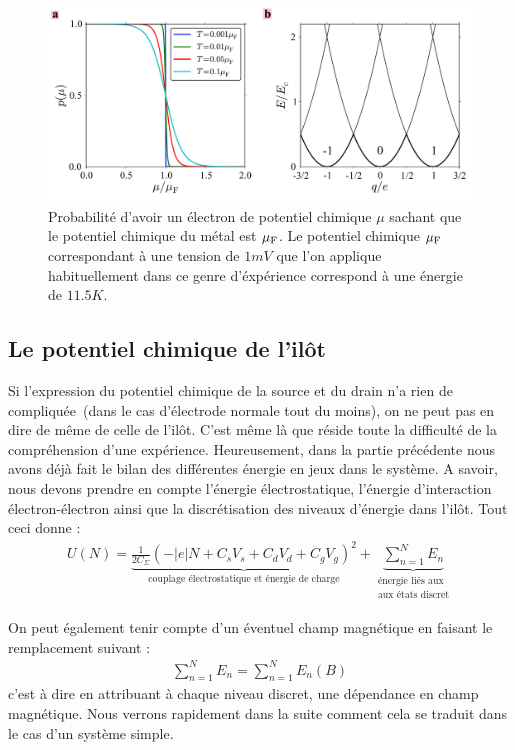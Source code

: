 \begin{figure}
\centering \includegraphics[scale=0.5]{Theorie/Transport/figure2/figure2.pdf} 
\caption{Probabilité d'avoir un électron de potentiel chimique $\mu$ sachant que le potentiel chimique du métal est $\mu_{\rm{F}}$. Le potentiel chimique $\mu_{\rm{F}}$ correspondant à une tension de $1mV$ que l'on applique habituellement dans ce genre d'éxpérience correspond à une énergie de $11.5K$.}
\label{distrib_fermi}
\end{figure}



\subsection{Le potentiel chimique de l'il\^ot}
Si l'expression du potentiel chimique de la source et du drain n'a rien de compliquée~(dans le cas d'électrode normale tout du moins), on ne peut pas en dire de m\^eme de celle de l'il\^ot. C'est m\^eme là que réside toute la difficulté de la compréhension d'une expérience. Heureusement, dans la partie précédente nous avons déjà fait le bilan des différentes énergie en jeux dans le système. A savoir, nous devons prendre en compte l'énergie électrostatique, l'énergie d'interaction électron-électron ainsi que la discrétisation des niveaux d'énergie dans l'il\^ot. Tout ceci donne :
\begin{eqnarray}
U(N) = \underbrace{\frac{1}{2C_{\Sigma}} (-|e|N + C_sV_s + C_dV_d + C_gV_g)^2}_{\text{couplage électrostatique et énergie de charge}}
+ 
\underbrace{\sum_{n=1}^{N} E_n}_{\substack{\text{énergie liés aux} \\\text{aux états discret}}}
\end{eqnarray}

On peut également tenir compte d'un éventuel champ magnétique en faisant le remplacement suivant :
\begin{eqnarray}
\sum_{n=1}^N E_n = \sum_{n=1}^N E_n(B) \nonumber
\end{eqnarray}
c'est à dire en attribuant à chaque niveau discret, une dépendance en champ magnétique. Nous verrons rapidement dans la suite comment cela se traduit dans le cas d'un système simple. 

